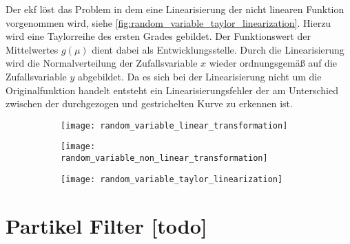Der \Gls{ekf} löst das Problem in dem eine Linearisierung der nicht linearen Funktion vorgenommen wird, siehe \autoref{fig:random_variable_taylor_linearization}. Hierzu wird eine Taylorreihe des ersten Grades gebildet. Der Funktionswert der Mittelwertes $g(\mu)$ dient dabei als Entwicklungsstelle. Durch die Linearisierung wird die Normalverteilung der Zufallsvariable $x$ wieder ordnungsgemäß auf die Zufallsvariable $y$ abgebildet. Da es sich bei der Linearisierung nicht um die Originalfunktion handelt entsteht ein Linearisierungsfehler der am Unterschied zwischen der durchgezogen und gestrichelten Kurve zu erkennen ist.

\begin{figure}
	\centering
	\begin{subfigure}{0.49\linewidth}
		\centering
		\texttt{[image: random\_variable\_linear\_transformation]}
		\caption{}
		\label{fig:random_variable_linear_transformation}
	\end{subfigure}
	\hfill
	\begin{subfigure}{0.49\linewidth}
		\centering
		\texttt{[image: random\_variable\_non\_linear\_transformation]}
		\caption{}
		\label{fig:random_variable_non_linear_transformation}
	\end{subfigure}
	\par
	\bigskip
	\begin{subfigure}{0.49\linewidth}
		\centering
		\texttt{[image: random\_variable\_taylor\_linearization]}
		\caption{}
		\label{fig:random_variable_taylor_linearization}
	\end{subfigure}
	\label{fig:random_variable_transformation}
\end{figure}


%
%
%
\section{Partikel Filter [todo]}


%
%
